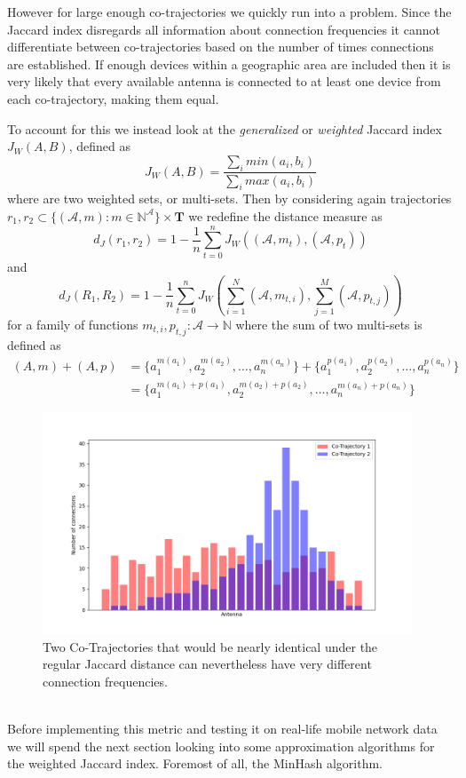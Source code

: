\documentclass[../main.tex]{subfiles}
\begin{document}
However for large enough co-trajectories we quickly run into a problem. Since the Jaccard index disregards all information about connection frequencies it cannot differentiate between co-trajectories based on the number of times connections are established. If enough devices within a geographic area are included then it is very likely that every available antenna is connected to at least one device from each co-trajectory, making
them equal.

To account for this we instead look at the \textit{generalized} or \textit{weighted} Jaccard index $J_W(A,B)$, defined as
$$
J_W(A,B) = \frac{\sum_imin(a_i,b_i)}{\sum_imax(a_i,b_i)}
$$
where are two weighted sets, or multi-sets. Then by considering again trajectories $r_1,r_2 \subset \{(\mathcal{A}, m):m\in\mathbb{N}^\mathcal{A}\}\times\mathbf{T}$ we redefine the distance measure as
$$
d_J(r_1, r_2) = 1 - \frac{1}{n}\sum_{t=0}^nJ_W((\mathcal{A}, m_t), (\mathcal{A}, p_t))
$$
and
$$
d_J(R_1, R_2) = 1 - \frac{1}{n}\sum_{t=0}^nJ_W(\sum_{i=1}^N(\mathcal{A}, m_{t,i}),\sum_{j=1}^M(\mathcal{A}, p_{t,j}))
$$
for a family of functions $m_{t,i}, p_{t,j}: \mathcal{A} \rightarrow \mathbb{N}$ where the sum of two multi-sets is defined as
\begin{align*}
    (A,m) + (A,p) &=  \{a_1^{m(a_1)},a_2^{m(a_2)},\dots, a_n^{m(a_n)}\} + 
    \{a_1^{p(a_1)},a_2^{p(a_2)},\dots, a_n^{p(a_n)}\} \\
    &= \{a_1^{m(a_1) + p(a_1)}, a_2^{m(a_2) + p(a_2)},\dots, a_n^{m(a_n) + p(a_n)}\}
\end{align*}
\begin{figure}[h]
\centering
\begin{adjustbox}{center}
\includegraphics[width=0.98\textwidth]{graphics/non-results/non-weighted.png}
\end{adjustbox}
\caption{Two Co-Trajectories that would be nearly identical under the regular Jaccard distance can nevertheless have very different connection frequencies.}
\end{figure}
\\
Before implementing this metric and testing it on real-life mobile network data we will spend the next section looking into some approximation algorithms for the weighted Jaccard index. Foremost of all, the MinHash algorithm.
\end{document}
